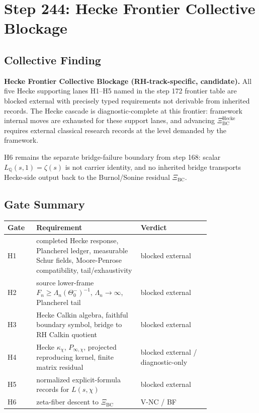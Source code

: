 \section*{Step 244: Hecke Frontier Collective Blockage}

\subsection*{Collective Finding}

\textbf{Hecke Frontier Collective Blockage (RH-track-specific, candidate).}
All five Hecke supporting lanes H1--H5 named in the step 172 frontier table are
blocked external with precisely typed requirements not derivable from inherited
records. The Hecke cascade is diagnostic-complete at this frontier: framework
internal moves are exhausted for these support lanes, and advancing
\(\Xi_{\mathrm{BC}}^{\mathrm{Hecke}}\) requires external classical research
records at the level demanded by the framework.

H6 remains the separate bridge-failure boundary from step 168: scalar
\(L_{\mathbb Q}(s,1)=\zeta(s)\) is not carrier identity, and no inherited bridge
transports Hecke-side output back to the Burnol/Sonine residual \(\Xi_{\mathrm{BC}}\).

\subsection*{Gate Summary}

\begin{tabular}{p{0.1\linewidth}p{0.42\linewidth}p{0.28\linewidth}}
\hline
Gate & Requirement & Verdict \\
\hline
H1 & completed Hecke response, Plancherel ledger, measurable Schur fields, Moore-Penrose compatibility, tail/exhaustivity & blocked external \\
H2 & source lower-frame \(F_n\geq \Lambda_n(\Theta_0^-)^{-1}\), \(\Lambda_n\to\infty\), Plancherel tail & blocked external \\
H3 & Hecke Calkin algebra, faithful boundary symbol, bridge to RH Calkin quotient & blocked external \\
H4 & Hecke \(\kappa_\chi\), \(P_{\infty,\chi}\), projected reproducing kernel, finite matrix residual & blocked external / diagnostic-only \\
H5 & normalized explicit-formula records for \(L(s,\chi)\) & blocked external \\
H6 & zeta-fiber descent to \(\Xi_{\mathrm{BC}}\) & V-NC / BF \\
\hline
\end{tabular}

